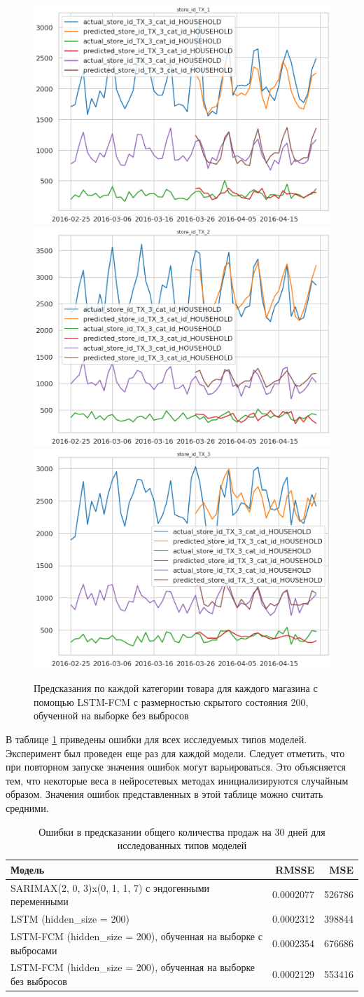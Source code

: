 \def\figurename{Рис}
\begin{figure}[t]
	\centering
	\includegraphics[width=0.25\columnwidth]{./img/fcm_lstm_tx1_110_days.png}
	\includegraphics[width=0.25\columnwidth]{./img/fcm_lstm_tx2_110_days.png}
	\includegraphics[width=0.25\columnwidth]{./img/fcm_lstm_tx3_110_days.png}
	\caption{Предсказания по каждой категории товара для каждого магазина с помощью LSTM-FCM с размерностью скрытого состояния 200, обученной на выборке без выбросов}
	\label{img:prediction_fcm_lstm_110d}
\end{figure}


В таблице \ref{tbl:all_models_comparation} приведены ошибки для всех исследуемых типов моделей.
Эксперимент был проведен еще раз для каждой модели. Следует отметить, что при повторном
запуске значения ошибок могут варьироваться. Это объясняется тем, что некоторые веса
в нейросетевых методах инициализируются случайным образом. Значения ошибок представленных
в этой таблице можно считать средними.

\begin{table}
    \caption{ Ошибки в предсказании общего количества продаж на 30 дней для исследованных типов моделей }
    \centering
    \begin{tabular}{|l|r||r|}
        \hline
            Модель                                                            & RMSSE     & MSE    \\
        \hline
            SARIMAX(2, 0, 3)x(0, 1, 1, 7) с эндогенными переменными           & 0.0002077 & 526786 \\
            LSTM (hidden\_size = 200)                                         & 0.0002312 & 398844 \\
            LSTM-FCM (hidden\_size = 200), обученная на выборке с выбросами   & 0.0002354 & 676686 \\
            LSTM-FCM (hidden\_size = 200), обученная на выборке без выбросов  & 0.0002129 & 553416 \\
        \hline
    \end{tabular}
    \label{tbl:all_models_comparation}
\end{table}

